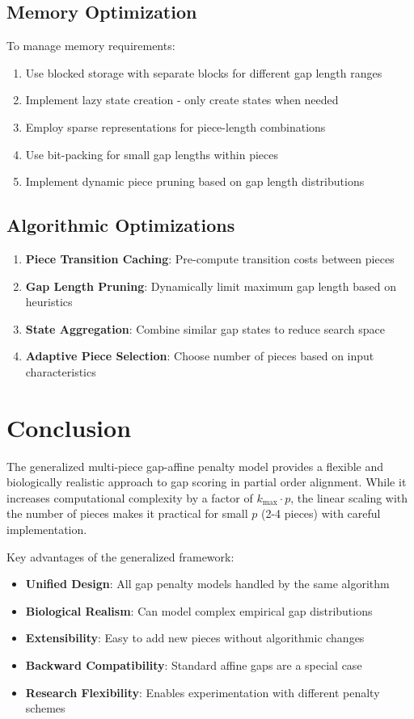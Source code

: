 \documentclass[11pt]{article}
\begin{document}
\subsection{Memory Optimization}

To manage memory requirements:
\begin{enumerate}
\item Use blocked storage with separate blocks for different gap length ranges
\item Implement lazy state creation - only create states when needed
\item Employ sparse representations for piece-length combinations
\item Use bit-packing for small gap lengths within pieces
\item Implement dynamic piece pruning based on gap length distributions
\end{enumerate}

\subsection{Algorithmic Optimizations}

\begin{enumerate}
\item \textbf{Piece Transition Caching}: Pre-compute transition costs between pieces
\item \textbf{Gap Length Pruning}: Dynamically limit maximum gap length based on heuristics
\item \textbf{State Aggregation}: Combine similar gap states to reduce search space
\item \textbf{Adaptive Piece Selection}: Choose number of pieces based on input characteristics
\end{enumerate}

\section{Conclusion}

The generalized multi-piece gap-affine penalty model provides a flexible and biologically realistic approach to gap scoring in partial order alignment. While it increases computational complexity by a factor of $k_{\max} \cdot p$, the linear scaling with the number of pieces makes it practical for small $p$ (2-4 pieces) with careful implementation.

Key advantages of the generalized framework:
\begin{itemize}
\item \textbf{Unified Design}: All gap penalty models handled by the same algorithm
\item \textbf{Biological Realism}: Can model complex empirical gap distributions
\item \textbf{Extensibility}: Easy to add new pieces without algorithmic changes
\item \textbf{Backward Compatibility}: Standard affine gaps are a special case
\item \textbf{Research Flexibility}: Enables experimentation with different penalty schemes
\end{itemize}
\end{document}
